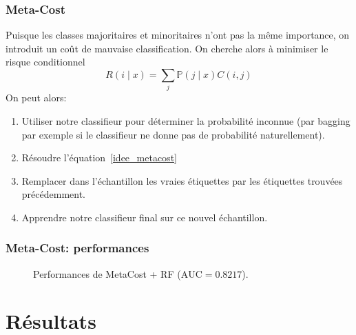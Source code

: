 \documentclass[dvipsnames,10pt]{beamer}
\theoremstyle{plain}
\theoremstyle{definition}
\begin{document}
\begin{frame}
\frametitle{Meta-Cost}
Puisque les classes majoritaires et minoritaires n'ont pas la même importance, on introduit un coût de mauvaise classification. On cherche alors à minimiser le risque conditionnel 
\begin{equation}
    R ( i \mid x ) = \sum_j \mathbb{P} ( j \mid x ) C(i,j) \label{idee_metacost}
\end{equation}
On peut alors:
\begin{enumerate}
    \item Utiliser notre classifieur pour déterminer la probabilité inconnue (par bagging par exemple si le classifieur ne donne pas de probabilité naturellement).
    \item Résoudre l'équation~\ref{idee_metacost}
    \item Remplacer dans l'échantillon les vraies étiquettes par les étiquettes  trouvées précédemment.
    \item Apprendre notre classifieur final sur ce nouvel échantillon.
\end{enumerate}
\end{frame}

\begin{frame}
\frametitle{Meta-Cost: performances}
\begin{figure}[H]
\centering
    \caption{Performances de MetaCost + RF ($\mathrm{AUC} = 0.8217$).}
\end{figure}
\end{frame}

\section{Résultats}
\end{document}
